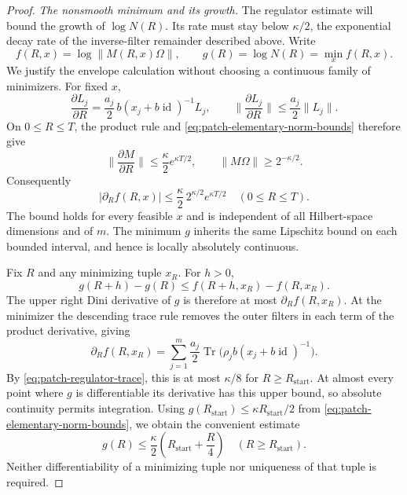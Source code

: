 \documentclass[11pt]{article}
\numberwithin{equation}{section}
\theoremstyle{definition}
\theoremstyle{remark}
\begin{document}
\begin{proof}
\emph{The nonsmooth minimum and its growth.}
The regulator estimate will bound the growth of $\log N(R)$.  Its rate
must stay below $\kappa/2$, the exponential decay rate of the
inverse-filter remainder described above.  Write
\[
 f(R,x)=\log\lVert M(R,x)\Omega\rVert,
 \qquad g(R)=\log N(R)=\min_x f(R,x).
\]
We justify the envelope calculation without choosing a continuous
family of minimizers.  For fixed \(x\),
\[
 \frac{\partial L_j}{\partial R}
       =\frac{a_j}{2}\,b(x_j+b\operatorname{id})^{-1}L_j,
 \qquad
 \lVert \frac{\partial L_j}{\partial R}\rVert
       \leq\frac{a_j}{2}\lVert L_j\rVert.
\]
On \(0\leq R\leq T\), the product rule and
\eqref{eq:patch-elementary-norm-bounds} therefore give
\[
 \lVert \frac{\partial M}{\partial R}\rVert
       \leq\frac{\kappa}{2}e^{\kappa T/2},
 \qquad
 \lVert M\Omega\rVert\geq2^{-\kappa/2}.
\]
Consequently
\begin{equation}
 \lvert \partial_R f(R,x)\rvert
       \leq \frac{\kappa}{2}\,2^{\kappa/2}e^{\kappa T/2}
       \quad(0\leq R\leq T).
 \label{eq:patch-uniform-local-lipschitz}
\end{equation}
The bound holds for every feasible \(x\) and is independent of all
Hilbert-space dimensions and of \(m\).  The minimum \(g\) inherits
the same Lipschitz bound on each bounded interval, and hence is
locally absolutely continuous.

Fix \(R\) and any minimizing tuple \(x_R\).  For \(h>0\),
\[
 g(R+h)-g(R)
       \leq f(R+h,x_R)-f(R,x_R).
\]
The upper right Dini derivative of \(g\) is therefore at most
\(\partial_R f(R,x_R)\).  At the minimizer the descending
trace rule removes the outer filters in each term of the product
derivative, giving
\[
 \partial_R f(R,x_R)
       =\sum_{j=1}^m\frac{a_j}{2}
          \operatorname{Tr}\bigl(\rho_j b(x_j+b\operatorname{id})^{-1}\bigr).
\]
By \eqref{eq:patch-regulator-trace}, this is at most
\(\kappa/8\) for \(R\geq R_{\mathrm{start}}\).
At almost every point where \(g\) is differentiable its derivative
has this upper bound, so absolute continuity permits integration.
Using \(g(R_{\mathrm{start}})\leq
\kappa R_{\mathrm{start}}/2\) from
\eqref{eq:patch-elementary-norm-bounds}, we obtain the convenient
estimate
\begin{equation}
 g(R)\leq\frac{\kappa}{2}
                 \left(R_{\mathrm{start}}+\frac R4\right)
       \quad(R\geq R_{\mathrm{start}}).
 \label{eq:patch-minimum-growth}
\end{equation}
Neither differentiability of a minimizing tuple nor uniqueness of
that tuple is required.


\end{proof}
\end{document}
